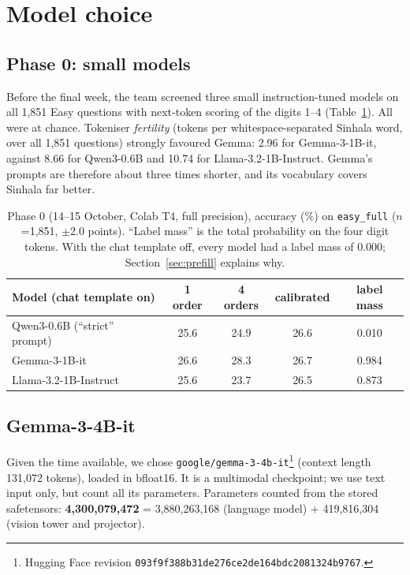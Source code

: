 \documentclass[10pt,a4paper]{article}
\begin{document}
\section{Model choice}\label{sec:model}
\subsection{Phase 0: small models}
Before the final week, the team screened three small instruction-tuned models on all 1,851 Easy questions with
next-token scoring of the digits 1--4 (Table~\ref{tab:phase0}). All were at chance. Tokeniser \emph{fertility}
(tokens per whitespace-separated Sinhala word, over all 1,851 questions) strongly favoured Gemma: 2.96 for
Gemma-3-1B-it, against 8.66 for Qwen3-0.6B and 10.74 for Llama-3.2-1B-Instruct. Gemma's prompts are therefore about
three times shorter, and its vocabulary covers Sinhala far better.

\begin{table}[h]
\centering\small
\begin{tabular}{lcccc}
\toprule
Model (chat template on) & 1 order & 4 orders & calibrated & label mass\\
\midrule
Qwen3-0.6B (``strict'' prompt) & 25.6 & 24.9 & 26.6 & 0.010\\
Gemma-3-1B-it & 26.6 & 28.3 & 26.7 & 0.984\\
Llama-3.2-1B-Instruct & 25.6 & 23.7 & 26.5 & 0.873\\
\bottomrule
\end{tabular}
\caption{Phase 0 (14--15 October, Colab T4, full precision), accuracy (\%) on \texttt{easy\_full} ($n$=1,851,
$\pm$2.0 points). ``Label mass'' is the total probability on the four digit tokens. With the chat template off,
every model had a label mass of 0.000; Section~\ref{sec:prefill} explains why.}
\label{tab:phase0}
\end{table}

\subsection{Gemma-3-4B-it}\label{sec:params}
Given the time available, we chose \texttt{google/gemma-3-4b-it}\footnote{Hugging Face revision
\texttt{093f9f388b31de276ce2de164bdc2081324b9767}.} (context length 131,072 tokens), loaded in bfloat16. It is a
multimodal checkpoint; we use text input only, but count all its parameters.
Parameters counted from the stored safetensors: \textbf{4,300,079,472} = 3,880,263,168 (language model) + 419,816,304
(vision tower and projector).
\end{document}
